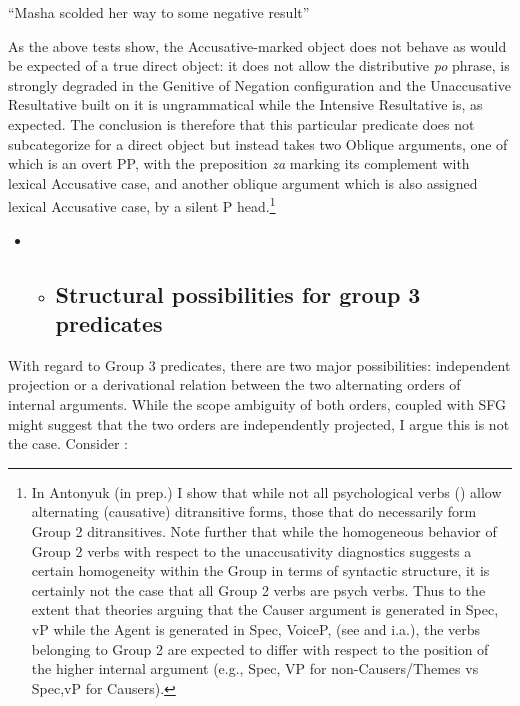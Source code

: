 \documentclass[output=paper,modfonts, nonflat]{langsci/langscibook}
\begin{document}
\begin{styleinnerExample}
\begin{styleinnerExample}
    “Masha scolded her way to some negative result”
\end{styleinnerExample}

As the above tests show, the Accusative-marked object does not behave as would be expected of a true direct object: it does not allow the distributive \textit{po} phrase, is strongly degraded in the Genitive of Negation configuration and the Unaccusative Resultative built on it is ungrammatical while the Intensive Resultative is, as expected. The conclusion is therefore that this particular predicate does not subcategorize for a direct object but instead takes two Oblique arguments, one of which is an overt PP, with the preposition \textit{za} marking its complement with lexical Accusative case, and another oblique argument which is also assigned lexical Accusative case, by a silent P head.\footnote{In Antonyuk (in prep.) I show that while not all psychological verbs (\citealt{BellettiRizzi1988}) allow alternating (causative) ditransitive forms, those that do necessarily form Group 2 ditransitives. Note further that while the homogeneous behavior of Group 2 verbs with respect to the unaccusativity diagnostics suggests a certain homogeneity within the Group in terms of syntactic structure, it is certainly not the case that all Group 2 verbs are psych verbs. Thus to the extent that theories arguing that the Causer argument is generated in Spec, vP while the Agent is generated in Spec, VoiceP, (see \citealt{Kratzer2005} and \citealt{AlexiadouEtAl2006} i.a.), the verbs belonging to Group 2 are expected to differ with respect to the position of the higher internal argument (e.g., Spec, VP for non-Causers/Themes vs Spec,vP for Causers).}

\begin{itemize}
\item \begin{itemize}
\item \subsection{Structural possibilities for group 3 predicates}
\end{itemize}
\end{itemize}

With regard to Group 3 predicates, there are two major possibilities: independent projection or a derivational relation between the two alternating orders of internal arguments. While the scope ambiguity of both orders, coupled with SFG might suggest that the two orders are independently projected, I argue this is not the case. Consider :


\end{styleinnerExample}
\end{document}
